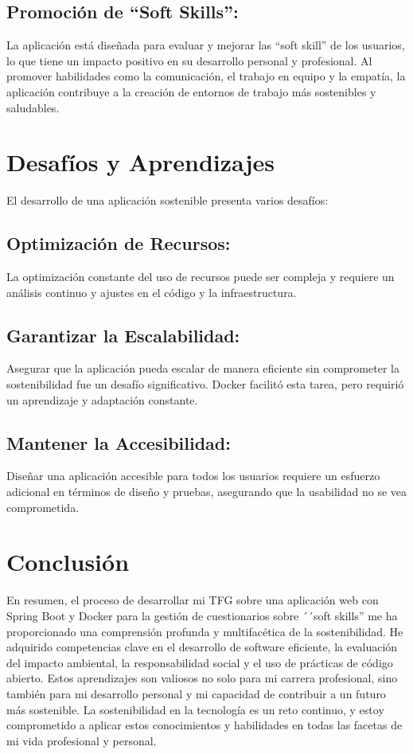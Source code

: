 \subsection{Promoción de ``Soft Skills'':}
La aplicación está diseñada para evaluar y mejorar las ``soft skill'' de los usuarios, lo que tiene un impacto positivo en su desarrollo personal y profesional. Al promover habilidades como la comunicación, el trabajo en equipo y la empatía, la aplicación contribuye a la creación de entornos de trabajo más sostenibles y saludables.

\section{Desafíos y Aprendizajes}
El desarrollo de una aplicación sostenible presenta varios desafíos:

\subsection{Optimización de Recursos:}
La optimización constante del uso de recursos puede ser compleja y requiere un análisis continuo y ajustes en el código y la infraestructura.

\subsection{Garantizar la Escalabilidad:}
Asegurar que la aplicación pueda escalar de manera eficiente sin comprometer la sostenibilidad fue un desafío significativo. Docker facilitó esta tarea, pero requirió un aprendizaje y adaptación constante.

\subsection{Mantener la Accesibilidad:}
Diseñar una aplicación accesible para todos los usuarios requiere un esfuerzo adicional en términos de diseño y pruebas, asegurando que la usabilidad no se vea comprometida.

\section{Conclusión}
En resumen, el proceso de desarrollar mi TFG sobre una aplicación web con Spring Boot y Docker para la gestión de cuestionarios sobre ´´soft skills'' me ha proporcionado una comprensión profunda y multifacética de la sostenibilidad. He adquirido competencias clave en el desarrollo de software eficiente, la evaluación del impacto ambiental, la responsabilidad social y el uso de prácticas de código abierto. Estos aprendizajes son valiosos no solo para mi carrera profesional, sino también para mi desarrollo personal y mi capacidad de contribuir a un futuro más sostenible. La sostenibilidad en la tecnología es un reto continuo, y estoy comprometido a aplicar estos conocimientos y habilidades en todas las facetas de mi vida profesional y personal.
